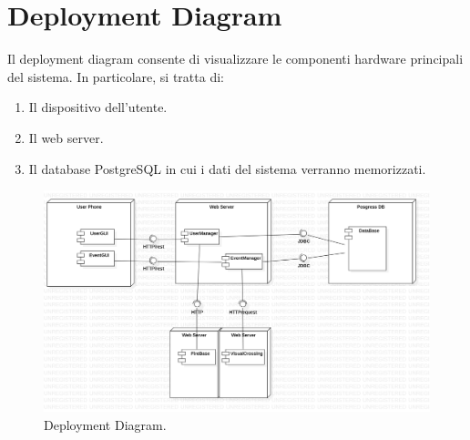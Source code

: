 \section{Deployment Diagram}
Il deployment diagram consente di visualizzare le componenti hardware principali del sistema.
In particolare, si tratta di:
\begin{enumerate}
	\item Il dispositivo dell'utente.
	\item Il web server.
	\item Il database PostgreSQL in cui i dati del sistema verranno memorizzati.
\end{enumerate}

\begin{figure}[h!]
	\centering
	\includegraphics[width=0.8\linewidth]{diagrammi/DeploymentDiagram1.png}
	\caption{Deployment Diagram.}
	\label{fig:DeploymentDiagram}
\end{figure}